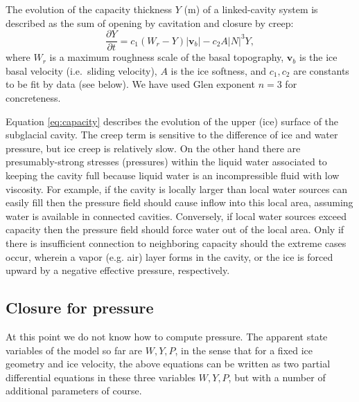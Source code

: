 \documentclass[12pt,final]{amsart}%
\newcommand\bv{\mathbf{v}}
\begin{document}
The evolution of the capacity thickness $Y$ (m) of a linked-cavity system is described as the sum of opening by cavitation and closure by creep:
\begin{equation}
\frac{\partial Y}{\partial t} = c_1 \left(W_r - Y\right) |\bv_b| - c_2 A |N|^3 Y, \label{eq:capacity}
\end{equation}
where $W_r$ is a maximum roughness scale of the basal topography, $\bv_b$ is the ice basal velocity (i.e.~sliding velocity), $A$ is the ice softness, and $c_1,c_2$ are constants to be fit by data (see below).  We have used Glen exponent $n=3$ for concreteness.

Equation \eqref{eq:capacity} describes the evolution of the upper (ice) surface of the subglacial cavity.  The creep term is sensitive to the difference of ice and water pressure, but ice creep is relatively slow.  On the other hand there are presumably-strong stresses (pressures) within the liquid water associated to keeping the cavity full because liquid water is an incompressible fluid with low viscosity.  For example, if the cavity is locally larger than local water sources can easily fill then the pressure field should cause inflow into this local area, assuming water is available in connected cavities.  Conversely, if local water sources exceed capacity then the pressure field should force water out of the local area.  Only if there is insufficient connection to neighboring capacity should the extreme cases occur, wherein a vapor (e.g. air) layer forms in the cavity, or the ice is forced upward by a negative effective pressure, respectively.

\subsection*{Closure for pressure}  At this point we do not know how to compute pressure.  The apparent state variables of the model so far are $W,Y,P$, in the sense that for a fixed ice geometry and ice velocity, the above equations can be written as two partial differential equations in these three variables $W,Y,P$, but with a number of additional parameters of course.
\end{document}
